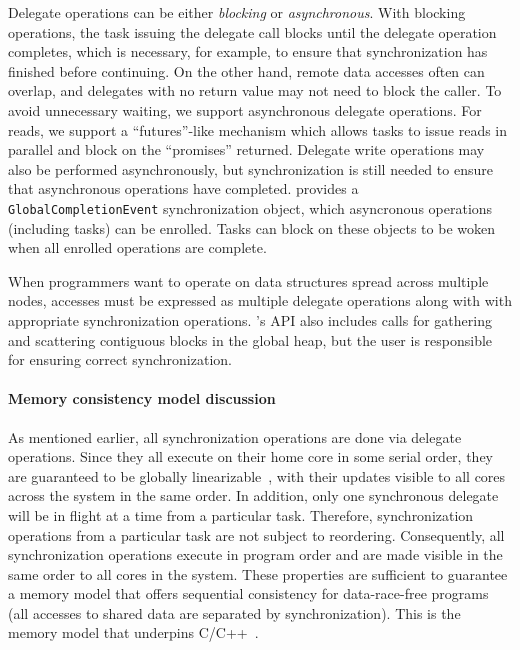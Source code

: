 Delegate operations can be either {\em blocking\/} or {\em asynchronous}.
With blocking operations, the task issuing the delegate call blocks until
the delegate operation completes, which is necessary, for example, to ensure
that synchronization has finished before continuing. On the other hand, remote data
accesses often can overlap, and delegates with no return value may not need to block the caller. 
To avoid unnecessary waiting, we support asynchronous delegate operations. For reads,
we support a ``futures''-like mechanism which allows tasks to issue reads in parallel and block on the ``promises'' returned. Delegate write operations may also be performed asynchronously, but synchronization is still needed to ensure that asynchronous operations have completed.
\Grappa provides a \texttt{GlobalCompletionEvent} synchronization object, which asyncronous operations (including tasks) can be enrolled. Tasks can block on these objects to be woken when all enrolled operations are complete.

When programmers want to operate on data structures spread across
multiple nodes, accesses must be expressed as multiple delegate
operations along with with appropriate synchronization
operations. \Grappa's API also includes calls for gathering and scattering
contiguous blocks in the global heap, but the user is responsible for
ensuring correct synchronization.

\paragraph{Memory consistency model discussion} As mentioned earlier, all
synchronization operations are done via delegate operations. Since they all
execute on their home core in some serial order, they are guaranteed to be globally linearizable~\cite{herlihy1990linearizability}, with their
updates visible to all cores across the system in the same order. In addition, only one synchronous delegate will be in flight at a time from a particular task. Therefore, synchronization operations from a particular task are not subject to reordering. 
Consequently, all synchronization operations execute in program order and are
made visible in the same order to all cores in the system. These properties
are sufficient to guarantee a memory model that offers sequential consistency
for data-race-free programs~\cite{AdveHill1990} (all accesses to shared data
are separated by synchronization). This is the memory model that underpins
C/C++~\cite{N2480,N2800}.

